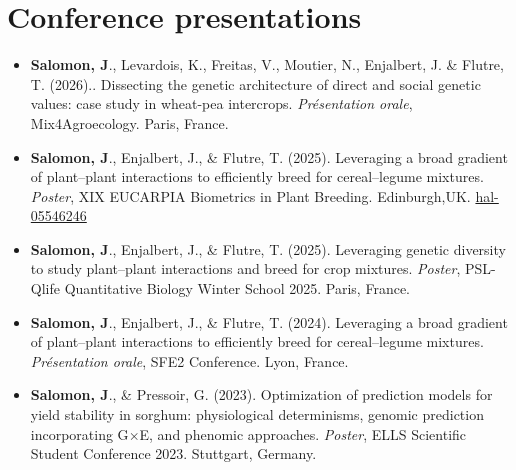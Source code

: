 \documentclass[10pt,a4paper]{article}
\begin{document}
\section{Conference presentations}
\begin{itemize}[label=\textemdash, itemsep=6pt]
  \item \textbf{Salomon, J}., Levardois, K., Freitas, V., Moutier, N., Enjalbert, J. \& Flutre, T. (2026).. Dissecting the genetic architecture of direct and social genetic values: case study in wheat-pea intercrops. \textit{Présentation orale}, Mix4Agroecology. Paris, France.
  \item \textbf{Salomon, J}., Enjalbert, J., \& Flutre, T. (2025). Leveraging a broad gradient of plant--plant interactions to efficiently breed for cereal--legume mixtures. \textit{Poster}, XIX EUCARPIA Biometrics in Plant Breeding. Edinburgh,UK. \href{https://hal.inrae.fr/hal-05546246}{hal-05546246}
  \item \textbf{Salomon, J}., Enjalbert, J., \& Flutre, T. (2025). Leveraging genetic diversity to study plant--plant interactions and breed for crop mixtures. \textit{Poster}, PSL-Qlife Quantitative Biology Winter School 2025. Paris, France.
  \item \textbf{Salomon, J}., Enjalbert, J., \& Flutre, T. (2024). Leveraging a broad gradient of plant--plant interactions to efficiently breed for cereal--legume mixtures. \textit{Présentation orale}, SFE2 Conference. Lyon, France.
  \item \textbf{Salomon, J}., \& Pressoir, G. (2023). Optimization of prediction models for yield stability in sorghum: physiological determinisms, genomic prediction incorporating G$\times$E, and phenomic approaches. \textit{Poster}, ELLS Scientific Student Conference 2023. Stuttgart, Germany.
\end{itemize}

\end{document}
